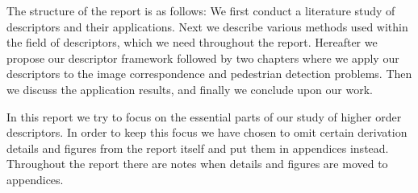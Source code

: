 \documentclass[thesis.tex]{subfiles}
\begin{document}
The structure of the report is as follows: We first conduct a literature study of descriptors and their applications. Next we describe various methods used within the field of descriptors, which we need throughout the report. Hereafter we propose our descriptor framework followed by two chapters where we apply our descriptors to the image correspondence and pedestrian detection problems. Then we discuss the application results, and finally we conclude upon our work.

In this report we try to focus on the essential parts of our study of higher order descriptors. In order to keep this focus we have chosen to omit certain derivation details and figures from the report itself and put them in appendices instead. Throughout the report there are notes when details and figures are moved to appendices.

\subbibliography
\end{document}
